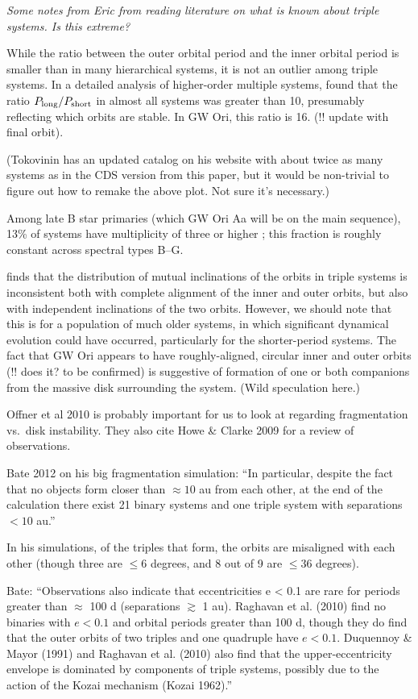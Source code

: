 \documentclass{aastex6}
\begin{document}
{\it Some notes from Eric from reading literature on what is known about triple systems.  Is this extreme?}

While the ratio between the outer orbital period and the inner orbital period is smaller than in many hierarchical systems, it is not an outlier among triple systems.  In a detailed analysis of higher-order multiple systems, \citet{tokovinin97} found that the ratio $P_{\rm long} / P_{\rm short}$ in almost all systems was greater than 10, presumably reflecting which orbits are stable.  In GW Ori, this ratio is 16.  (!! update with final orbit).

(Tokovinin has an updated catalog on his website with about twice as many systems as in the CDS version from this paper, but it would be non-trivial to figure out how to remake the above plot.  Not sure it's necessary.)

Among late B star primaries (which GW Ori Aa will be on the main sequence), 13\% of systems have multiplicity of three or higher \citep{eggleton08}; this fraction is roughly constant across spectral types B--G.

\citet{tokovinin97} finds that the distribution of mutual inclinations of the orbits in triple systems is inconsistent both with complete alignment of the inner and outer orbits, but also with independent inclinations of the two orbits.  However, we should note that this is for a population of much older systems, in which significant dynamical evolution could have occurred, particularly for the shorter-period systems.  The fact that GW Ori appears to have roughly-aligned, circular inner and outer orbits (!! does it?  to be confirmed) is suggestive of formation of one or both companions from the massive disk surrounding the system.  (Wild speculation here.)

Offner et al 2010 is probably important for us to look at regarding fragmentation vs.\ disk instability.  They also cite Howe \& Clarke 2009 for a review of observations.

Bate 2012 on his big fragmentation simulation: ``In particular, despite the fact that no objects form closer than $\approx 10$ au from each other, at the end of the calculation there exist 21 binary systems and one triple system with separations $<10$ au.''

In his simulations, of the triples that form, the orbits are misaligned with each other (though three are $\leq 6$ degrees, and 8 out of 9 are $\leq 36$ degrees).

Bate:  ``Observations also indicate that eccentricities e < 0.1 are rare for periods greater than $\approx$ 100 d (separations $\gtrsim$ 1 au). Raghavan et al. (2010) find no binaries with $e < 0.1$ and orbital periods greater than 100 d, though they do find that the outer orbits of two triples and one quadruple have $e < 0.1$. Duquennoy \& Mayor (1991) and Raghavan et al. (2010) also find that the upper-eccentricity envelope is dominated by components of triple systems, possibly due to the action of the Kozai mechanism (Kozai 1962).''
\end{document}
